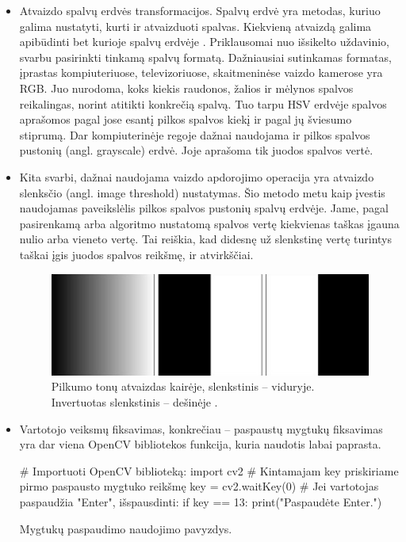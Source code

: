 \documentclass[a4paper,12pt]{article}
\begin{document}
\begin{itemize}
	\item Atvaizdo spalvų erdvės transformacijos. Spalvų erdvė yra metodas, kuriuo galima nustatyti, kurti ir atvaizduoti spalvas. Kiekvieną atvaizdą galima apibūdinti bet kurioje spalvų erdvėje \cite{COLORSPACE}. Priklausomai nuo išsikelto uždavinio, svarbu pasirinkti tinkamą spalvų formatą. Dažniausiai sutinkamas formatas, įprastas kompiuteriuose, televizoriuose, skaitmeninėse vaizdo kamerose yra RGB. Juo nurodoma, koks kiekis raudonos, žalios ir mėlynos spalvos reikalingas, norint atitikti konkrečią spalvą. Tuo tarpu HSV erdvėje spalvos aprašomos pagal jose esantį pilkos spalvos kiekį ir pagal jų šviesumo stiprumą. Dar kompiuterinėje regoje dažnai naudojama ir pilkos spalvos pustonių (angl. grayscale) erdvė. Joje aprašoma tik juodos spalvos vertė. 
	\item  Kita svarbi, dažnai naudojama vaizdo apdorojimo operacija yra atvaizdo slenksčio (angl. image threshold) nustatymas. Šio metodo metu kaip įvestis naudojamas paveikslėlis pilkos spalvos pustonių spalvų erdvėje. Jame, pagal pasirenkamą arba algoritmo nustatomą spalvos vertę kiekvienas taškas įgauna nulio arba vieneto vertę. Tai reiškia, kad didesnę už slenkstinę vertę turintys taškai įgis juodos spalvos reikšmę, ir atvirkščiai.
	\begin{figure}[H]
			\centering
			\includegraphics[scale=0.4]{images/threshold}
			\caption{Pilkumo tonų atvaizdas kairėje, slenkstinis – viduryje. Invertuotas slenkstinis – dešinėje \cite{THRESHOLD}.}   %
			\label{img:threshold}
	\end{figure}
	
	\item Vartotojo veiksmų fiksavimas, konkrečiau – paspaustų mygtukų fiksavimas yra dar viena OpenCV bibliotekos funkcija, kuria naudotis labai paprasta.
	\begin{listing}[H]
		\begin{pythoncode}
# Importuoti OpenCV biblioteką:
import cv2
# Kintamajam key priskiriame pirmo paspausto mygtuko reikšmę
key = cv2.waitKey(0)
# Jei vartotojas paspaudžia "Enter", išspausdinti:
if key == 13:
	print("Paspaudėte Enter.")
		\end{pythoncode}
		\caption{Mygtukų paspaudimo naudojimo pavyzdys.}		
	\end{listing}
	

\end{itemize}
\end{document}
